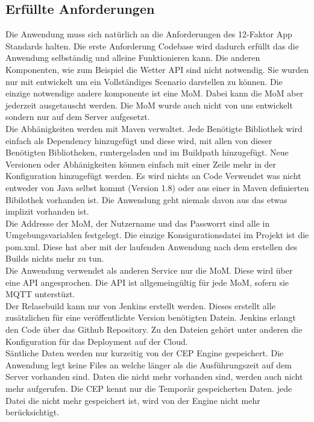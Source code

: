 \subsection{Erfüllte Anforderungen}
Die Anwendung muss sich natürlich an die Anforderungen des 12-Faktor App Standards halten. Die erste Anforderung Codebase wird dadurch erfüllt das die Anwendung selbständig und alleine Funktionieren kann. Die anderen Komponenten, wie zum Beispiel die Wetter API sind nicht notwendig. Sie wurden nur mit entwickelt um ein Vollständiges Scenario darstellen zu können. Die einzige notwendige andere komponente ist eine MoM. Dabei kann die MoM aber jederzeit ausgetauscht werden. Die MoM wurde auch nicht von uns entwickelt sondern nur auf dem Server aufgesetzt. 
\\
Die Abhänigkeiten werden mit Maven verwaltet. Jede Benötigte Bibliothek wird einfach als Dependency hinzugefügt und diese wird, mit allen von dieser Benötigten Bibliotheken, runtergeladen und im Buildpath hinzugefügt. Neue Versionen oder Abhänigkeiten können einfach mit einer Zeile mehr in der Konfiguration hinzugefügt werden. Es wird nichts an Code Verwendet was nicht entweder von Java selbst kommt (Version 1.8) oder aus einer in Maven definierten Bibilothek vorhanden ist. Die Anwendung geht niemals davon aus das etwas implizit vorhanden ist.
\\
Die Addresse der MoM, der Nutzername und das Passworrt sind alle in Umgebungsvariablen festgelegt. Die einzige Konsigurationsdatei im Projekt ist die pom.xml. Diese hat aber mit der laufenden Anwendung nach dem erstellen des Builds nichts mehr zu tun. 
\\
Die Anwendung verwendet als anderen Service nur die MoM. Diese wird über eine API angesprochen. Die API ist allgemeingültig für jede MoM, sofern sie MQTT unterstüzt. 
\\
Der Relasebuild kann nur von Jenkins erstellt werden. Dieses erstellt alle zusätzlichen für eine veröffentlichte Version benötigten Datein. Jenkins erlangt den Code über das Github Repository. Zu den Dateien gehört unter anderen die Konfiguration für das Deployment auf der Cloud.
\\
Säntliche Daten werden nur kurzeitig von der CEP Engine gespeichert. Die Anwendung legt keine Files an welche länger als die Ausführungszeit auf dem Server vorhanden sind. Daten die nicht mehr vorhanden sind, werden auch nicht mehr aufgerufen. Die CEP kennt nur die Temporär gespeicherten Daten. jede Datei die nicht mehr gespeichert ist, wird von der Engine nicht mehr berücksichtigt. 
